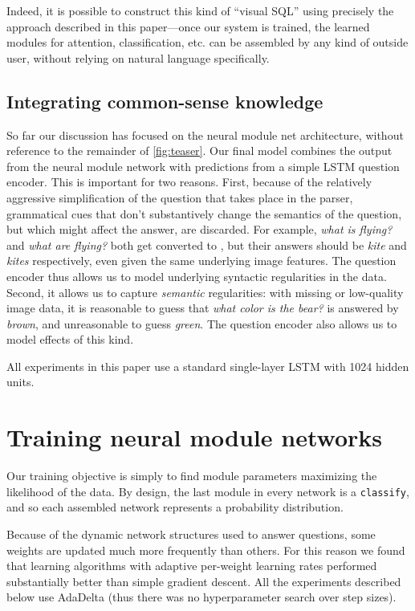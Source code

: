 Indeed, it is possible to construct this kind of ``visual SQL'' using precisely
the approach described in this paper---once our system is trained, the learned
modules for attention, classification, etc. can be assembled by any kind of
outside user, without relying on natural language specifically.

\subsection{Integrating common-sense knowledge}

So far our discussion has focused on the neural module net architecture, without
reference to the remainder of \autoref{fig:teaser}. Our final model combines the output
from the neural module network with predictions from a simple LSTM question
encoder. This is important for two reasons. First, because of the relatively
aggressive simplification of the question that takes place in the parser,
grammatical cues that don't substantively change the semantics of the question,
but which might affect the answer, are discarded. For example, \emph{what is
flying?} and \emph{what are flying?} both get converted to , but
their answers should be \emph{kite} and \emph{kites} respectively, even given
the same underlying image features. The question encoder thus allows us to model
underlying syntactic regularities in the data. Second, it allows us to capture
\emph{semantic} regularities: with missing or low-quality image data, it is
reasonable to guess that \emph{what color is the bear?} is answered by
\emph{brown}, and unreasonable to guess \emph{green}. The question encoder also
allows us to model effects of this kind.

All experiments in this paper use a standard single-layer LSTM with 1024 hidden
units.

\section{Training neural module networks}

Our training objective is simply to find module parameters maximizing the
likelihood of the data. By design, the last module in every network is a
{\small\tt classify}, and so each assembled network represents a probability
distribution.

Because of the dynamic network structures used to answer questions, some weights
are updated much more frequently than others. For this reason we found that
learning algorithms with adaptive per-weight learning rates performed
substantially better than simple gradient descent. All the experiments described
below use AdaDelta \cite{Zeiler12Adadelta}  (thus there was no hyperparameter
search over step sizes).

